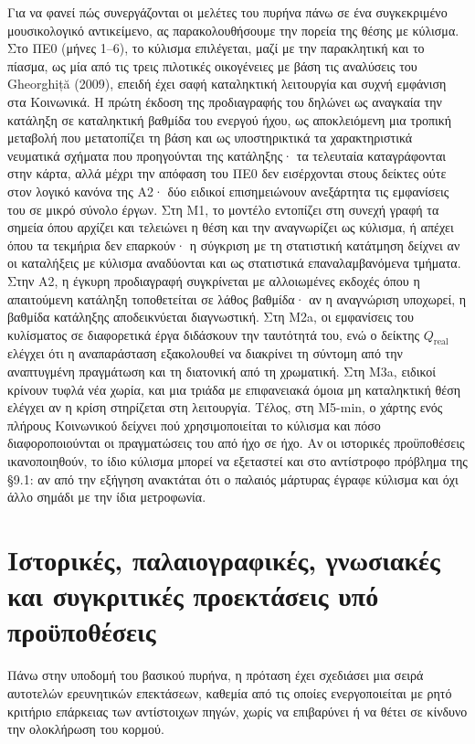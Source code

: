 \documentclass[11pt,a4paper]{article}
\begin{document}
Για να φανεί πώς συνεργάζονται οι μελέτες του πυρήνα πάνω σε ένα συγκεκριμένο μουσικολογικό αντικείμενο, ας παρακολουθήσουμε την πορεία της θέσης με κύλισμα. Στο ΠΕ0 (μήνες 1--6), το κύλισμα επιλέγεται, μαζί με την παρακλητική και το πίασμα, ως μία από τις τρεις πιλοτικές οικογένειες με βάση τις αναλύσεις του Gheorghiță (2009), επειδή έχει σαφή καταληκτική λειτουργία και συχνή εμφάνιση στα Κοινωνικά. Η πρώτη έκδοση της προδιαγραφής του δηλώνει ως αναγκαία την κατάληξη σε καταληκτική βαθμίδα του ενεργού ήχου, ως αποκλειόμενη μια τροπική μεταβολή που μετατοπίζει τη βάση και ως υποστηρικτικά τα χαρακτηριστικά νευματικά σχήματα που προηγούνται της κατάληξης· τα τελευταία καταγράφονται στην κάρτα, αλλά μέχρι την απόφαση του ΠΕ0 δεν εισέρχονται στους δείκτες ούτε στον λογικό κανόνα της Α2· δύο ειδικοί επισημειώνουν ανεξάρτητα τις εμφανίσεις του σε μικρό σύνολο έργων. Στη Μ1, το μοντέλο εντοπίζει στη συνεχή γραφή τα σημεία όπου αρχίζει και τελειώνει η θέση και την αναγνωρίζει ως κύλισμα, ή απέχει όπου τα τεκμήρια δεν επαρκούν· η σύγκριση με τη στατιστική κατάτμηση δείχνει αν οι καταλήξεις με κύλισμα αναδύονται και ως στατιστικά επαναλαμβανόμενα τμήματα. Στην Α2, η έγκυρη προδιαγραφή συγκρίνεται με αλλοιωμένες εκδοχές όπου η απαιτούμενη κατάληξη τοποθετείται σε λάθος βαθμίδα· αν η αναγνώριση υποχωρεί, η βαθμίδα κατάληξης αποδεικνύεται διαγνωστική. Στη Μ2a, οι εμφανίσεις του κυλίσματος σε διαφορετικά έργα διδάσκουν την ταυτότητά του, ενώ ο δείκτης $Q_{\text{real}}$ ελέγχει ότι η αναπαράσταση εξακολουθεί να διακρίνει τη σύντομη από την αναπτυγμένη πραγμάτωση και τη διατονική από τη χρωματική. Στη Μ3a, ειδικοί κρίνουν τυφλά νέα χωρία, και μια τριάδα με επιφανειακά όμοια μη καταληκτική θέση ελέγχει αν η κρίση στηρίζεται στη λειτουργία. Τέλος, στη Μ5-min, ο χάρτης ενός πλήρους Κοινωνικού δείχνει πού χρησιμοποιείται το κύλισμα και πόσο διαφοροποιούνται οι πραγματώσεις του από ήχο σε ήχο. Αν οι ιστορικές προϋποθέσεις ικανοποιηθούν, το ίδιο κύλισμα μπορεί να εξεταστεί και στο αντίστροφο πρόβλημα της §9.1: αν από την εξήγηση ανακτάται ότι ο παλαιός μάρτυρας έγραφε κύλισμα και όχι άλλο σημάδι με την ίδια μετροφωνία.

\section{Ιστορικές, παλαιογραφικές, γνωσιακές και συγκριτικές προεκτάσεις υπό προϋποθέσεις}

Πάνω στην υποδομή του βασικού πυρήνα, η πρόταση έχει σχεδιάσει μια σειρά αυτοτελών ερευνητικών επεκτάσεων, καθεμία από τις οποίες ενεργοποιείται με ρητό κριτήριο επάρκειας των αντίστοιχων πηγών, χωρίς να επιβαρύνει ή να θέτει σε κίνδυνο την ολοκλήρωση του κορμού.
\end{document}
